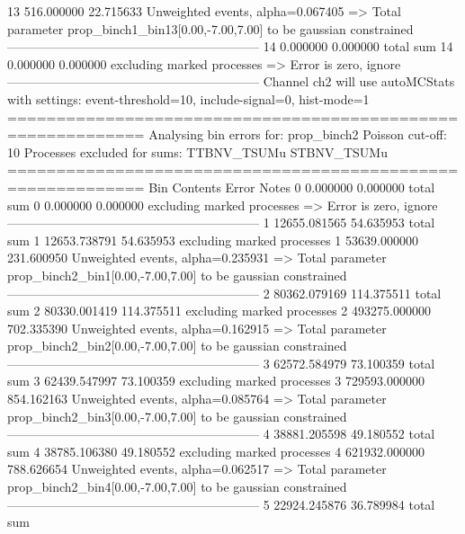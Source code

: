 13         516.000000      22.715633       Unweighted events, alpha=0.067405
  => Total parameter prop_binch1_bin13[0.00,-7.00,7.00] to be gaussian constrained
------------------------------------------------------------
14         0.000000        0.000000        total sum                     
14         0.000000        0.000000        excluding marked processes    
  => Error is zero, ignore      
------------------------------------------------------------
Channel ch2 will use autoMCStats with settings: event-threshold=10, include-signal=0, hist-mode=1
============================================================
Analysing bin errors for: prop_binch2
Poisson cut-off: 10
Processes excluded for sums: TTBNV_TSUMu STBNV_TSUMu
============================================================
Bin        Contents        Error           Notes                         
0          0.000000        0.000000        total sum                     
0          0.000000        0.000000        excluding marked processes    
  => Error is zero, ignore      
------------------------------------------------------------
1          12655.081565    54.635953       total sum                     
1          12653.738791    54.635953       excluding marked processes    
1          53639.000000    231.600950      Unweighted events, alpha=0.235931
  => Total parameter prop_binch2_bin1[0.00,-7.00,7.00] to be gaussian constrained
------------------------------------------------------------
2          80362.079169    114.375511      total sum                     
2          80330.001419    114.375511      excluding marked processes    
2          493275.000000   702.335390      Unweighted events, alpha=0.162915
  => Total parameter prop_binch2_bin2[0.00,-7.00,7.00] to be gaussian constrained
------------------------------------------------------------
3          62572.584979    73.100359       total sum                     
3          62439.547997    73.100359       excluding marked processes    
3          729593.000000   854.162163      Unweighted events, alpha=0.085764
  => Total parameter prop_binch2_bin3[0.00,-7.00,7.00] to be gaussian constrained
------------------------------------------------------------
4          38881.205598    49.180552       total sum                     
4          38785.106380    49.180552       excluding marked processes    
4          621932.000000   788.626654      Unweighted events, alpha=0.062517
  => Total parameter prop_binch2_bin4[0.00,-7.00,7.00] to be gaussian constrained
------------------------------------------------------------
5          22924.245876    36.789984       total sum                     
